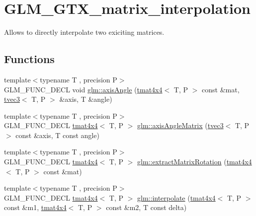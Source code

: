 \hypertarget{group__gtx__matrix__interpolation}{}\section{G\+L\+M\+\_\+\+G\+T\+X\+\_\+matrix\+\_\+interpolation}
\label{group__gtx__matrix__interpolation}


Allows to directly interpolate two exiciting matrices.  


\subsection*{Functions}
\begin{DoxyCompactItemize}
\item 
{\footnotesize template$<$typename T , precision P$>$ }\\G\+L\+M\+\_\+\+F\+U\+N\+C\+\_\+\+D\+E\+CL void \hyperlink{group__gtx__matrix__interpolation_ga9aef292eb5f29bdbb58a53ef4281af92}{glm\+::axis\+Angle} (\hyperlink{structglm_1_1tmat4x4}{tmat4x4}$<$ T, P $>$ const \&mat, \hyperlink{structglm_1_1tvec3}{tvec3}$<$ T, P $>$ \&axis, T \&angle)
\item 
{\footnotesize template$<$typename T , precision P$>$ }\\G\+L\+M\+\_\+\+F\+U\+N\+C\+\_\+\+D\+E\+CL \hyperlink{structglm_1_1tmat4x4}{tmat4x4}$<$ T, P $>$ \hyperlink{group__gtx__matrix__interpolation_ga82d4bc058e9628cb2ea1d4e117a0cf39}{glm\+::axis\+Angle\+Matrix} (\hyperlink{structglm_1_1tvec3}{tvec3}$<$ T, P $>$ const \&axis, T const angle)
\item 
{\footnotesize template$<$typename T , precision P$>$ }\\G\+L\+M\+\_\+\+F\+U\+N\+C\+\_\+\+D\+E\+CL \hyperlink{structglm_1_1tmat4x4}{tmat4x4}$<$ T, P $>$ \hyperlink{group__gtx__matrix__interpolation_ga6b8170aa4cf43caf81400696ebb38afe}{glm\+::extract\+Matrix\+Rotation} (\hyperlink{structglm_1_1tmat4x4}{tmat4x4}$<$ T, P $>$ const \&mat)
\item 
{\footnotesize template$<$typename T , precision P$>$ }\\G\+L\+M\+\_\+\+F\+U\+N\+C\+\_\+\+D\+E\+CL \hyperlink{structglm_1_1tmat4x4}{tmat4x4}$<$ T, P $>$ \hyperlink{group__gtx__matrix__interpolation_ga45099a92c5c704503565619ac2bcd5c6}{glm\+::interpolate} (\hyperlink{structglm_1_1tmat4x4}{tmat4x4}$<$ T, P $>$ const \&m1, \hyperlink{structglm_1_1tmat4x4}{tmat4x4}$<$ T, P $>$ const \&m2, T const delta)
\end{DoxyCompactItemize}


